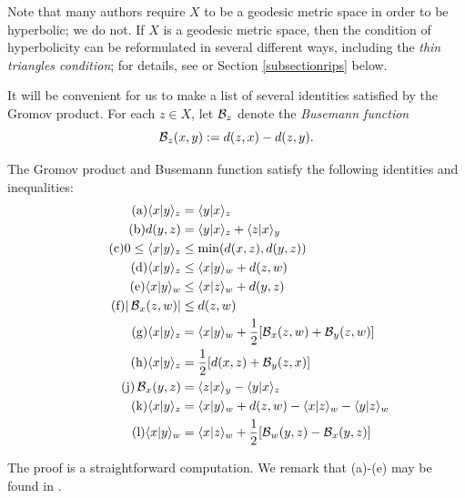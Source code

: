 Note that many authors require $X$ to be a geodesic metric space in order to be hyperbolic; we do not. If $X$ is a geodesic metric space, then the condition of hyperbolicity can be reformulated in several different ways, including the \emph{thin triangles condition}; for details, see \cite[\6 III.H.1]{BridsonHaefliger} or Section \ref{subsectionrips} below.

It will be convenient for us to make a list of several identities satisfied by the Gromov product. For each $z\in X$, let $\operatorname{\mathcal B}_z$ denote the \emph{Busemann function}
\begin{equation}
\label{busemanndef}
\operatorname{\mathcal B}_z(x,y) := d(z,x) - d(z,y).
\end{equation}


\begin{proposition}
\label{propositionbasicidentities}
The Gromov product and Busemann function satisfy the following identities and inequalities:
\begin{align*}
\tag{a} \lb x|y\rb_z &= \lb y|x\rb_z \\
\tag{b} \dist(y,z) &= \lb y|x\rb_z + \lb z|x\rb_y\\
\tag{c} 0\leq \lb x|y\rb_z &\leq \min(\dist(x,z),\dist(y,z))\\
\tag{d} \lb x|y\rb_z &\leq \lb x|y\rb_w + \dist(z,w)\\
\tag{e} \lb x|y\rb_w &\leq \lb x|z\rb_w + \dist(y,z)\\
\tag{f} |\busemann_x(z,w)| &\leq \dist(z,w)\\
\tag{g} \lb x|y\rb_z &= \lb x|y\rb_w + \frac12[\busemann_x(z,w) + \busemann_y(z,w)]\\
\tag{h} \lb x|y\rb_z &= \frac12[\dist(x,z) + \busemann_y(z,x)]\\
\tag{j} \busemann_x(y,z) &= \lb z|x\rb_y - \lb y|x\rb_z \\
\tag{k} \lb x|y\rb_z &= \lb x|y\rb_w + \dist(z,w) - \lb x|z\rb_w - \lb y|z\rb_w\\%
\tag{l} \lb x|y\rb_w &= \lb x|z\rb_w + \frac12[\busemann_w(y,z) - \busemann_x(y,z)]
\end{align*}
\end{proposition}
The proof is a straightforward computation. We remark that (a)-(e) may be found in \cite[Lemma 2.8]{Vaisala}.%

